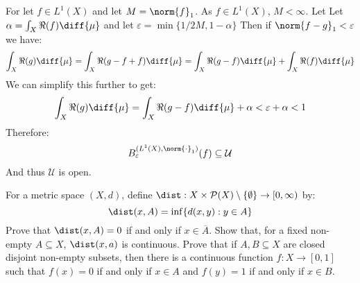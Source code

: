 \documentclass[crop=false,class=article,oneside]{standalone}
\begin{document}
    \begin{solution}
        For let $f\in{L}^{1}(X)$ and let $M=\norm{f}_{1}$. As
        $f\in{L}^{1}(X)$, $M<\infty$. Let
        Let $\alpha=\int_{X}\Re(f)\diff{\mu}$ and let
        $\varepsilon=\min\{1/2M,1-\alpha\}$
        Then if $\norm{f-g}_{1}<\varepsilon$ we have:
        \begin{equation}
            \int_{X}\Re(g)\diff{\mu}=
            \int_{X}\Re(g-f+f)\diff{\mu}=
            \int_{X}\Re(g-f)\diff{\mu}+\int_{X}\Re(f)\diff{\mu}
        \end{equation}
        We can simplify this further to get:
        \begin{equation}
            \int_{X}\Re(g)\diff{\mu}
            =\int_{X}\Re(g-f)\diff{\mu}+\alpha
            <\varepsilon+\alpha<1
        \end{equation}
        Therefore:
        \begin{equation}
            B_{\varepsilon}^{(L^{1}(X),\norm{\cdot}_{1})}(f)
            \subseteq\mathcal{U}
        \end{equation}
        And thus $\mathcal{U}$ is open.
    \end{solution}
    \begin{problem}
        For a metric space $(X,d)$, define
        $\dist:X\times\mathcal{P}(X)\setminus\{\emptyset\}%
         \rightarrow[0,\infty)$ by:
        \begin{equation}
            \dist(x,A)=\inf\{d(x,y):y\in{A}\}
        \end{equation}
        Prove that $\dist(x,A)=0$ if and only if $x\in\overline{A}$.
        Show that, for a fixed non-empty $A\subseteq{X}$, $\dist(x,a)$ is
        continuous. Prove that if $A,B\subseteq{X}$ are closed disjoint
        non-empty subsets, then there is a continuous function
        $f:X\rightarrow[0,1]$ such that $f(x)=0$ if and only if
        $x\in{A}$ and $f(y)=1$ if and only if $x\in{B}$.
    \end{problem}
\end{document}
